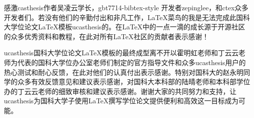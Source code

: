 感激casthesis作者吴凌云学长，gbt7714-bibtex-style
开发者zepinglee，和ctex众多开发者们。若没有他们的辛勤付出和非凡工作，\LaTeX{}菜鸟的我是无法完成此国科大学位论文\LaTeX{}模板ucasthesis的。在\LaTeX{}中的一点一滴的成长源于开源社区的众多优秀资料和教程，在此对所有\LaTeX{}社区的贡献者表示感谢！

ucasthesis国科大学位论文\LaTeX{}模板的最终成型离不开以霍明虹老师和丁云云老师为代表的国科大学位办公室老师们制定的官方指导文件和众多ucasthesis用户的热心测试和耐心反馈，在此对他们的认真付出表示感谢。特别对国科大的赵永明同学的众多有效反馈意见和建议表示感谢，对国科大本科部的陆晴老师和本科部学位办的丁云云老师的细致审核和建议表示感谢。谢谢大家的共同努力和支持，让ucasthesis为国科大学子使用\LaTeX{}撰写学位论文提供便利和高效这一目标成为可能。

\cleardoublepage[plain]%
